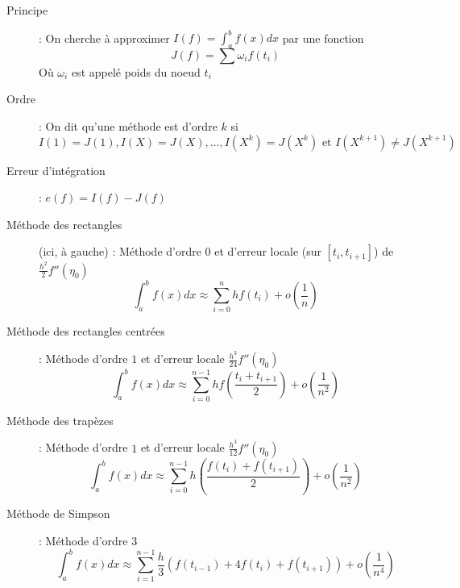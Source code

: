 \begin{description}
\item[Principe] : On cherche à approximer $I(f)=\int_a^bf(x)dx$ par une fonction
    \[ J(f)=\sum\omega_if(t_i) \]
    Où $\omega_i$ est appelé poids du noeud $t_i$
\item[Ordre] : On dit qu'une méthode est d'ordre $k$ si
    \[
        I(1)=J(1), I(X)=J(X), \dots, I(X^k)=J(X^k)\textrm{ et } I(X^{k+1})\ne J(X^{k+1})
    \]
\item[Erreur d'intégration] : $e(f)=I(f)-J(f)$
\item[Méthode des rectangles] (ici, à gauche) : Méthode d'ordre $0$ et d'erreur locale (sur $[t_i,t_{i+1}]$) de $\frac{h^2}{2}f''(\eta_0)$
    \[
        \int_a^bf(x)dx\approx\sum_{i=0}^nhf(t_i)+o\left(\frac{1}{n}\right)
    \]
\item[Méthode des rectangles centrées] : Méthode d'ordre $1$ et d'erreur locale $\frac{h^3}{24}f''(\eta_0)$
    \[
        \int_a^bf(x)dx\approx\sum_{i=0}^{n-1}hf\left(\frac{t_i+t_{i+1}}{2}\right)+o\left(\frac{1}{n^2}\right)
    \]
\item[Méthode des trapèzes] : Méthode d'ordre $1$ et d'erreur locale $\frac{h^3}{12}f''(\eta_0)$
    \[
        \int_a^bf(x)dx\approx\sum_{i=0}^{n-1}h\left( \frac{f(t_i)+f(t_{i+1})}{2} \right) +o\left(\frac{1}{n^2}\right)
    \]
\item[Méthode de Simpson] : Méthode d'ordre $3$
    \[
        \int_a^bf(x)dx\approx\sum_{i=1}^{n-1}\frac{h}{3}( f(t_{i-1}) + 4f(t_i) + f(t_{i+1}) ) +o\left(\frac{1}{n^4}\right)
    \]
\end{description}